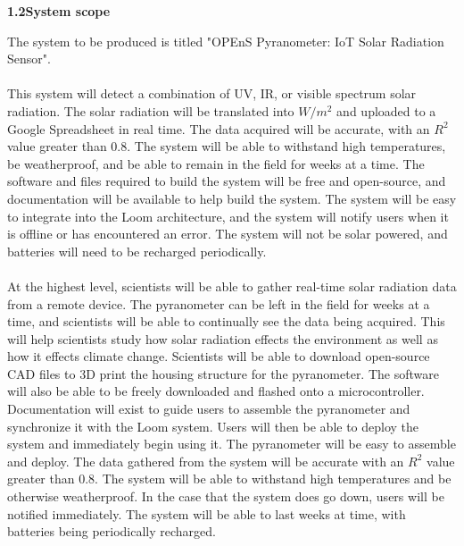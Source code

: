 \documentclass[10pt,draftclsnofoot,onecolumn,letterpaper]{article}
\begin{document}
{\fontsize{10pt}{12.0pt} \textbf{1.2\quad System scope}\\\selectfont 
\par}\par
{\fontsize{10pt}{12.0pt} The system to be produced is titled "OPEnS Pyranometer: IoT Solar Radiation Sensor".\\\\This system will detect a combination of UV, IR, or visible spectrum solar radiation. The solar radiation will be translated into $W/m^2$ and uploaded to a Google Spreadsheet in real time. The data acquired will be accurate, with an $R^2$ value greater than 0.8. The system will be able to withstand high temperatures, be weatherproof, and be able to remain in the field for weeks at a time. The software and files required to build the system will be free and open-source, and documentation will be available to help build the system. The system will be easy to integrate into the Loom architecture, and the system will notify users when it is offline or has encountered an error. The system will not be solar powered, and batteries will need to be recharged periodically.\\\\At the highest level, scientists will be able to gather real-time solar radiation data from a remote device. The pyranometer can be left in the field for weeks at a time, and scientists will be able to continually see the data being acquired. This will help scientists study how solar radiation effects the environment as well as how it effects climate change. Scientists will be able to download open-source CAD files to 3D print the housing structure for the pyranometer. The software will also be able to be freely downloaded and flashed onto a microcontroller. Documentation will exist to guide users to assemble the pyranometer and synchronize it with the Loom system. Users will then be able to deploy the system and immediately begin using it. The pyranometer will be easy to assemble and deploy. The data gathered from the system will be accurate with an $R^2$ value greater than 0.8. The system will be able to withstand high temperatures and be otherwise weatherproof. In the case that the system does go down, users will be notified immediately. The system will be able to last weeks at time, with batteries being periodically recharged. \\\selectfont 
\par}\par
\end{document}
